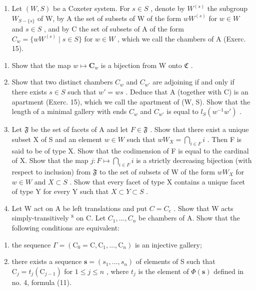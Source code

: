\begin{enumerate}
\def\labelenumi{\arabic{enumi})}
\setcounter{enumi}{15}
\tightlist
\item
  Let \((W,S)\) be a Coxeter system. For \(s \in S\) , denote by \(W^{(s)}\) the subgroup \(W_{S-\{s\}}\) of W, by A the set of subsets of W of the form \(wW^{(s)}\) for \(w \in W\) and \(s \in S\) , and by C the set of subsets of A of the form \(C_w = \{wW^{(s)} \mid s \in S\}\) for \(w \in W\) , which we call the chambers of A (Exerc. 15).
\end{enumerate}

\begin{enumerate}
\def\labelenumi{\alph{enumi})}
\item
  Show that the map \(w \mapsto \mathbf{C}_w\) is a bijection from W onto \(\mathfrak{C}\) .
\item
  Show that two distinct chambers \(C_{w}\) and \(C_{w'}\) are adjoining if and only if there exists \(s \in S\) such that \(w' = ws\) . Deduce that A (together with C) is an apartment (Exerc. 15), which we call the apartment of (W, S). Show that the length of a minimal gallery with ends \(C_{w}\) and \(C_{w'}\) is equal to \(l_{S}(w^{-1}w')\) .
\item
  Let \(\mathfrak{F}\) be the set of facets of A and let \(F \in \mathfrak{F}\) . Show that there exist a unique subset X of S and an element \(w \in W\) such that \(wW_X = \bigcap_{i \in F} i\) . Then F is said to be of type X. Show that the codimension of F is equal to the cardinal of X. Show that the map \(j: F \mapsto \bigcap_{i \in F} i\) is a strictly decreasing bijection (with respect to inclusion) from \(\mathfrak{F}\) to the set of subsets of W of the form \(wW_X\) for \(w \in W\) and \(X \subset S\) . Show that every facet of type X contains a unique facet of type Y for every Y such that \(X \subset Y \subset S\) .
\item
  Let W act on A be left translations and put \(C = C_{e}\) . Show that W acts simply-transitively \(^{8}\) on C. Let \(C_{1}, \ldots, C_{n}\) be chambers of A. Show that the following conditions are equivalent:
\end{enumerate}

\begin{enumerate}
\def\labelenumi{(\roman{enumi})}
\item
  the sequence \(\Gamma = (\mathrm{C}_0 = \mathrm{C},\mathrm{C}_1,\dots ,\mathrm{C}_n)\) is an injective gallery;
\item
  there exists a sequence \(\mathbf{s} = (s_1, \ldots, s_n)\) of elements of S such that \(\mathrm{C}_j = t_j(\mathrm{C}_{j-1})\) for \(1 \leqslant j \leqslant n\) , where \(t_j\) is the element of \(\Phi(\mathbf{s})\) defined in no. 4, formula (11).
\end{enumerate}

